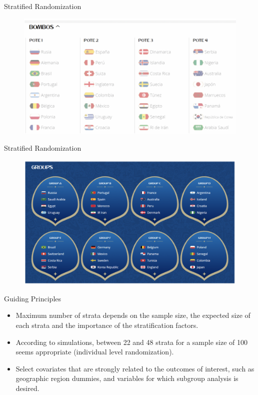 \documentclass[aspectratio=169]{beamer}
\begin{document}
\begin{frame}{Stratified Randomization}

\begin{figure}
	\centering
	\includegraphics[width=125mm]{img/Clusters2}
\end{figure}

\end{frame}


\begin{frame}{Stratified Randomization}

\begin{figure}
	\centering
	\includegraphics[width=125mm]{img/Clusters3}
\end{figure}

\end{frame}


\begin{frame}{Guiding Principles }

\begin{itemize}[<default overlay specification>]
	\item<1>  Maximum number of strata depends on the sample size, the expected size of each strata and the importance of the stratification factors.
	\item<1>  According to simulations, between 22 and 48 strata for a sample size of 100 seems appropriate (individual level randomization). 
	\item<1>  Select covariates that are strongly related to the outcomes of interest, such as geographic region dummies, and variables for which subgroup analysis is desired.
\end{itemize}

\end{frame}
\end{document}
